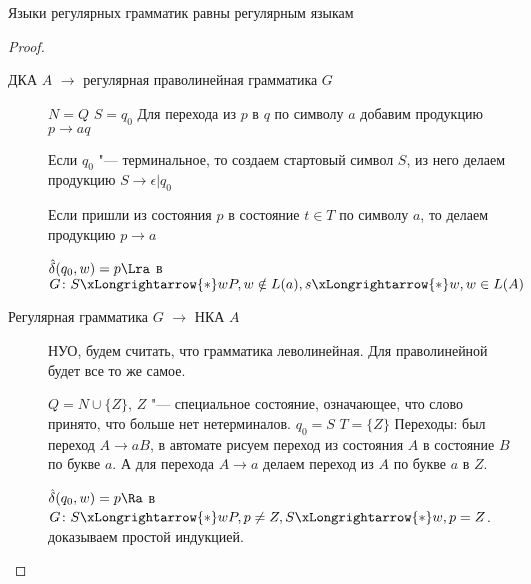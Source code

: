 \begin{theorem}
Языки регулярных грамматик равны регулярным языкам
\end{theorem}
\begin{proof}
\begin{description}
\item[ДКА $A$ $\to$ регулярная праволинейная грамматика $G$]

$N = Q$
$S = q_0$
Для перехода из $p$ в $q$ по символу $a$ добавим продукцию $p \to aq$

Если $q_0$ "--- терминальное, то создаем стартовый символ $S$, из него делаем продукцию $S \to \epsilon | q_0$

Если пришли из состояния $p$ в состояние $t \in T$ по символу $a$, то делаем продукцию $p \to a$

$\hat \delta(q_0, w) = p \Lra $ в $G\colon S \xLongrightarrow{*} wP, w \notin L(a), s \xLongrightarrow{*} w, w \in L(A)$
\item[Регулярная грамматика $G$ $\to$ НКА $A$]

НУО, будем считать, что грамматика леволинейная. Для праволинейной будет все то же самое.

$Q = N \cup \{Z\}$, $Z$ "--- специальное состояние, означающее, что слово принято, что больше нет нетерминалов.
$q_0 = S$
$T = \{Z\}$
Переходы: был переход $A \to aB$, в автомате рисуем переход из состояния $A$ в состояние $B$ по букве $a$. 
А для перехода $A \to a$ делаем переход из $A$ по букве $a$ в $Z$.

$\hat\delta(q_0, w) = p \Ra $ в $G\colon S \xLongrightarrow{*} wP, p \neq Z, S \xLongrightarrow{*} w, p = Z$. 
доказываем простой индукцией.
\end{description}
\end{proof}

